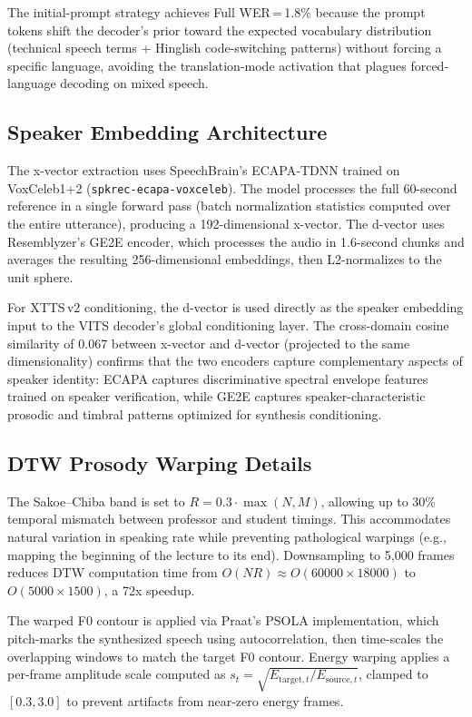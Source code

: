 \documentclass[11pt]{article}
\begin{document}
The initial-prompt strategy achieves Full WER\,=\,1.8\% because the
prompt tokens shift the decoder's prior toward the expected vocabulary
distribution (technical speech terms + Hinglish code-switching patterns)
without forcing a specific language, avoiding the translation-mode
activation that plagues forced-language decoding on mixed speech.

\subsection{Speaker Embedding Architecture}

The x-vector extraction uses SpeechBrain's ECAPA-TDNN trained on
VoxCeleb1+2 (\texttt{spkrec-ecapa-voxceleb}). The model processes
the full 60-second reference in a single forward pass (batch normalization
statistics computed over the entire utterance), producing a 192-dimensional
x-vector. The d-vector uses Resemblyzer's GE2E encoder, which processes
the audio in 1.6-second chunks and averages the resulting 256-dimensional
embeddings, then L2-normalizes to the unit sphere.

For XTTS\,v2 conditioning, the d-vector is used directly as the speaker
embedding input to the VITS decoder's global conditioning layer. The
cross-domain cosine similarity of 0.067 between x-vector and d-vector
(projected to the same dimensionality) confirms that the two encoders
capture complementary aspects of speaker identity: ECAPA captures
discriminative spectral envelope features trained on speaker verification,
while GE2E captures speaker-characteristic prosodic and timbral patterns
optimized for synthesis conditioning.

\subsection{DTW Prosody Warping Details}

The Sakoe--Chiba band is set to $R = 0.3 \cdot \max(N, M)$, allowing up to
30\% temporal mismatch between professor and student timings. This
accommodates natural variation in speaking rate while preventing
pathological warpings (e.g., mapping the beginning of the lecture to its
end). Downsampling to 5,000 frames reduces DTW computation time from
$O(NR) \approx O(60000 \times 18000)$ to $O(5000 \times 1500)$, a 72x
speedup.

The warped F0 contour is applied via Praat's PSOLA implementation, which
pitch-marks the synthesized speech using autocorrelation, then time-scales
the overlapping windows to match the target F0 contour. Energy warping
applies a per-frame amplitude scale computed as
$s_t = \sqrt{E_{\text{target},t} / E_{\text{source},t}}$, clamped to
$[0.3, 3.0]$ to prevent artifacts from near-zero energy frames.
\end{document}
